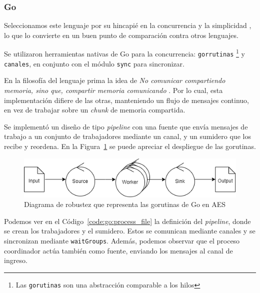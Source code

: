 \documentclass[11pt]{article}
\let\Oldsubsubsection\subsubsection
\renewcommand{\subsubsection}{\FloatBarrier\Oldsubsubsection}
\newcommand{\english}[1]{\textit{#1}}
\newcommand{\technical}[1]{\textit{#1}}
\begin{document}
\subsubsection{Go}

Seleccionamos este lenguaje por su hincapié en la concurrencia \cite{go:ex:concurrency_patterns} y la simplicidad \cite{go:ex:simple}, lo que lo convierte en un buen punto de comparación contra otros lenguajes.

Se utilizaron herramientas nativas de Go para la concurrencia: \lstinline{gorrutinas} \footnote{Las \lstinline{gorutinas} son una abstracción comparable a los hilos} y \lstinline{canales}, en conjunto con el módulo \lstinline{sync} para sincronizar.

En la filosofía del lenguaje prima la idea de \technical{No comunicar compartiendo memoria, sino que, compartir memoria comunicando} \cite{go:ex:sharing}. Por lo cual, esta implementación difiere de las otras, manteniendo un flujo de mensajes continuo, en vez de trabajar sobre un \english{chunk} de memoria compartida.

Se implementó un diseño de tipo \english{pipeline} con una fuente que envía mensajes de trabajo a un conjunto de trabajadores mediante un canal, y un sumidero que los recibe y reordena. En la Figura~\ref{fig:go:robustness} se puede apreciar el despliegue de las gorutinas.

\begin{figure}[h]
    \centering
    \includegraphics[scale=0.7]{resources/aes/go_robustness.png}
    \caption{Diagrama de robustez que representa las gorutinas de Go en AES}
    \label{fig:go:robustness}
\end{figure}

Podemos ver en el Código~\ref{code:go:process_file} la definición del \english{pipeline}, donde se crean los trabajadores y el sumidero. Estos se comunican mediante canales y se sincronizan mediante \lstinline{waitGroups}. Además, podemos observar que el proceso coordinador actúa también como fuente, enviando los mensajes al canal de ingreso.
\end{document}
